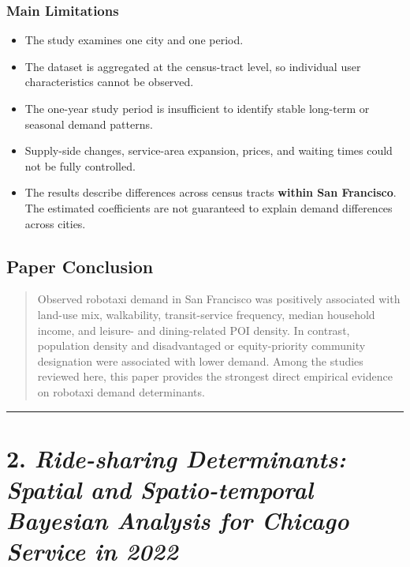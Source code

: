\documentclass[10pt,a4paper]{article}
\providecommand{\tightlist}{\setlength{\itemsep}{0pt}\setlength{\parskip}{0pt}}
\begin{document}
\hypertarget{main-limitations}{%
\subsubsection{Main Limitations}\label{main-limitations}}

\begin{itemize}
\tightlist
\item
  The study examines one city and one period.
\item
  The dataset is aggregated at the census-tract level, so individual user characteristics cannot be observed.
\item
  The one-year study period is insufficient to identify stable long-term or seasonal demand patterns.
\item
  Supply-side changes, service-area expansion, prices, and waiting times could not be fully controlled.
\item
  The results describe differences across census tracts \textbf{within San Francisco}. The estimated coefficients are not guaranteed to explain demand differences across cities.
\end{itemize}

\hypertarget{paper-conclusion}{%
\subsection{Paper Conclusion}\label{paper-conclusion}}

\begin{quote}
Observed robotaxi demand in San Francisco was positively associated with land-use mix, walkability, transit-service frequency, median household income, and leisure- and dining-related POI density. In contrast, population density and disadvantaged or equity-priority community designation were associated with lower demand. Among the studies reviewed here, this paper provides the strongest direct empirical evidence on robotaxi demand determinants.
\end{quote}

\begin{center}\rule{0.5\linewidth}{0.5pt}\end{center}

\hypertarget{ride-sharing-determinants-spatial-and-spatio-temporal-bayesian-analysis-for-chicago-service-in-2022}{%
\section{\texorpdfstring{2. \emph{Ride-sharing Determinants: Spatial and Spatio-temporal Bayesian Analysis for Chicago Service in 2022}}{2. Ride-sharing Determinants: Spatial and Spatio-temporal Bayesian Analysis for Chicago Service in 2022}}\label{ride-sharing-determinants-spatial-and-spatio-temporal-bayesian-analysis-for-chicago-service-in-2022}}
\end{document}
